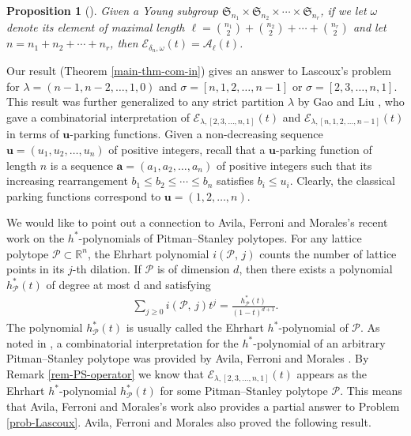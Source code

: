 \documentclass[12pt]{article}
\newtheorem{prop}[thm]{Proposition}
\numberwithin{equation}{section}
\begin{document}
\begin{prop}[{\cite[Corollary 6.3]{Lascoux-2016}}]
Given a Young subgroup $\mathfrak{S}_{n_1}\times \mathfrak{S}_{n_2}\times\cdots\times \mathfrak{S}_{n_r}$, if we let $\omega$ denote its element of maximal length $\ell=\binom{n_1}{2}+\binom{n_2}{2}+\cdots+\binom{n_r}{2}$ and let $n=n_1+n_2+\cdots+n_r$, then ${\mathcal{E}}_{\delta_n,\omega}(t)=\mathcal{A}_{\ell}(t)$. 
\end{prop}

Our result (Theorem \ref{main-thm-com-in}) gives an answer to Lascoux's problem for $\lambda=(n-1,n-2,\ldots,1,0)$ and $\sigma=[n, 1,2,\ldots,n-1]$ or $\sigma=[2,3,\ldots,n,1]$.
This result was further generalized to any strict partition $\lambda$ by Gao and Liu \cite{Gao-Liu-2026+}, who gave a combinatorial interpretation of ${\mathcal{E}}_{\lambda,[2,3,\ldots,n,1]}(t)$ and ${\mathcal{E}}_{\lambda,[n, 1,2,\ldots,n-1]}(t)$ in terms of $\mathbf{u}$-parking functions. Given a non-decreasing sequence $\mathbf{u}=(u_1,u_2,\ldots,u_n)$ of positive integers, recall that a $\mathbf{u}$-parking function of length $n$ is a sequence 
$\mathbf{a}=(a_1,a_2,\ldots,a_n)$ of positive integers such that its increasing rearrangement $b_1\leq b_2\leq \cdots\leq b_n$  satisfies $b_{i}\leq u_i$. Clearly, the classical parking functions correspond to $\mathbf{u}=(1,2,\ldots,n)$. 

We would like to point out a connection to Avila, Ferroni and Morales's recent work \cite{Avila-Ferroni-Morales-2026a} on the $h^*$-polynomials of Pitman–Stanley polytopes. 
For any lattice polytope $\mathcal{P}\subset\mathbb{R}^n$, the Ehrhart polynomial $i(\mathcal{P},\,j)$ counts the number of lattice points in its $j$-th dilation.
If $\mathcal{P}$ is of dimension $d$, then there exists a polynomial $h^*_{\mathcal{P}}(t)$ of degree at most d and satisfying
\begin{align}\label{eq-hstarpol}
\sum_{j\geq 0} i(\mathcal{P},\,j) t^j=\frac{h^*_{\mathcal{P}}(t)}{(1-t)^{d+1}}.
\end{align}
The polynomial $h^*_{\mathcal{P}}(t)$ is usually called the Ehrhart $h^*$-polynomial of $\mathcal{P}$. 
As noted in \cite[P. 4]{Avila-Ferroni-Morales-2026b}, a combinatorial interpretation for the $h^*$-polynomial of an arbitrary Pitman–Stanley
polytope was provided by Avila, Ferroni and Morales \cite{Avila-Ferroni-Morales-2026a}. By Remark \ref{rem-PS-operator} we know that ${\mathcal{E}}_{\lambda,[2,3,\ldots,n,1]}(t)$
appears as the Ehrhart $h^*$-polynomial $h^*_{\mathcal{P}}(t)$ for some Pitman–Stanley polytope $\mathcal{P}$. This means that Avila, Ferroni and Morales's work \cite{Avila-Ferroni-Morales-2026a} also 
provides a partial answer to Problem \ref{prob-Lascoux}. Avila, Ferroni and Morales \cite{Avila-Ferroni-Morales-2026b} also proved the following result. 
\end{document}
